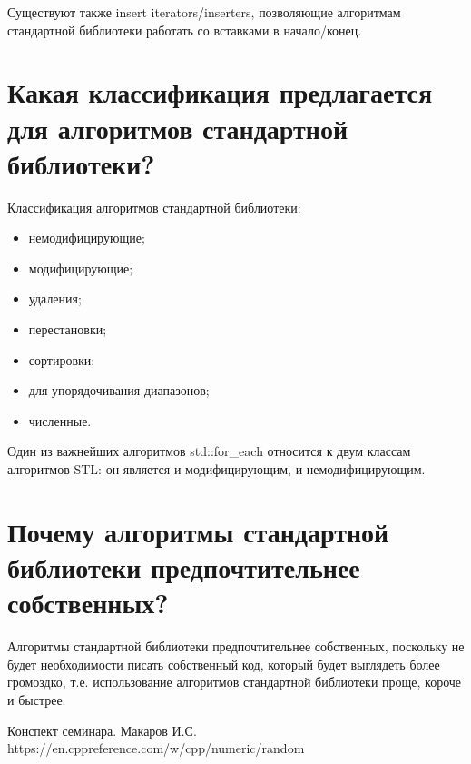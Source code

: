\documentclass[a4paper,12pt]{article}	%
\begin{document}
	Существуют также insert iterators/inserters, позволяющие алгоритмам стандартной библиотеки работать со вставками в начало/конец.

\section{Какая классификация предлагается для алгоритмов стандартной библиотеки?}

	Классификация алгоритмов стандартной библиотеки:
	
	\begin{itemize}
	
		\item немодифицирующие;
		
		\item модифицирующие;
		
		\item удаления;
		
		\item перестановки;
		
		\item сортировки;
		
		\item для упорядочивания диапазонов;
		
		\item численные.
	
	\end{itemize}
	
	Один из важнейших алгоритмов std::for\_each относится к двум классам алгоритмов STL: он является и модифицирующим, и немодифицирующим.

\section{Почему алгоритмы стандартной библиотеки предпочтительнее собственных?}
	
	Алгоритмы стандартной библиотеки предпочтительнее собственных, поскольку не будет необходимости писать собственный код, который будет выглядеть более громоздко, т.е. использование алгоритмов стандартной библиотеки проще, короче и быстрее.	
		
\newpage


 
	\begin{thebibliography}{}
	
		 Конспект семинара. Макаров И.С.
		 https://en.cppreference.com/w/cpp/numeric/random
		
	\end{thebibliography}
\end{document}
